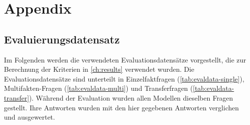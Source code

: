 \chapter*{Appendix}\label{ch:appendix}
\section*{Evaluierungsdatensatz}\label{app:evaldata}
{\normalsize
Im Folgenden werden die verwendeten Evaluationsdatensätze vorgestellt, die zur Berechnung der Kriterien in \cref{ch:results} verwendet wurden.
Die Evaluationsdatensätze sind unterteilt in Einzelfaktfragen (\cref{tab:evaldata-single}), Multifakten-Fragen (\cref{tab:evaldata-multi}) und Transferfragen (\cref{tab:evaldata-transfer}).
Während der Evaluation wurden allen Modellen dieselben Fragen gestellt.
Ihre Antworten wurden mit den hier gegebenen Antworten verglichen und ausgewertet. \par}
